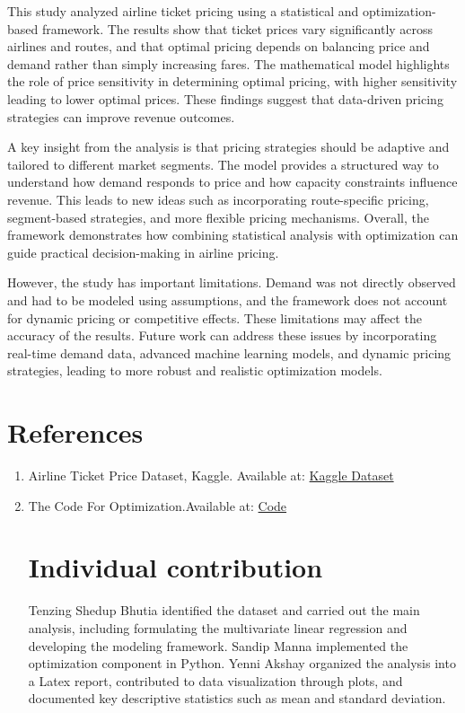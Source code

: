 \documentclass[12pt]{article}
\begin{document}
This study analyzed airline ticket pricing using a statistical and optimization-based framework. The results show that ticket prices vary significantly across airlines and routes, and that optimal pricing depends on balancing price and demand rather than simply increasing fares. The mathematical model highlights the role of price sensitivity in determining optimal pricing, with higher sensitivity leading to lower optimal prices. These findings suggest that data-driven pricing strategies can improve revenue outcomes.

A key insight from the analysis is that pricing strategies should be adaptive and tailored to different market segments. The model provides a structured way to understand how demand responds to price and how capacity constraints influence revenue. This leads to new ideas such as incorporating route-specific pricing, segment-based strategies, and more flexible pricing mechanisms. Overall, the framework demonstrates how combining statistical analysis with optimization can guide practical decision-making in airline pricing.

However, the study has important limitations. Demand was not directly observed and had to be modeled using assumptions, and the framework does not account for dynamic pricing or competitive effects. These limitations may affect the accuracy of the results. Future work can address these issues by incorporating real-time demand data, advanced machine learning models, and dynamic pricing strategies, leading to more robust and realistic optimization models.

\section{References}

\begin{enumerate}

\item Airline Ticket Price Dataset, Kaggle. Available at: \href{https://www.kaggle.com/datasets/umerabbasi658/data-train-xlsx?resource=download}{Kaggle Dataset}
\item The Code For Optimization.Available at:
\href{https://github.com/sandip743357mannasandip-bot/AIRLINE-TICKET-PRICING-OPTIMIZATION-/blob/main/optimization.py}{Code}
\section{Individual contribution}
Tenzing Shedup Bhutia identified the dataset and carried out the main analysis, including formulating the multivariate linear regression and developing the modeling framework. Sandip Manna implemented the optimization component in Python. Yenni Akshay organized the analysis into a Latex report, contributed to data visualization through plots, and documented key descriptive statistics such as mean and standard deviation.
\end{enumerate}
\end{document}
